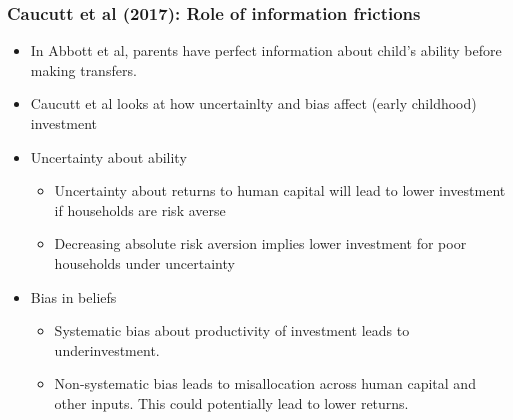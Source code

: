 \documentclass{beamer}
\begin{document}
\begin{frame}
\frametitle{Caucutt et al (2017): Role of information frictions}
\begin{itemize}
\item In Abbott et al, parents have perfect information about child's ability before making transfers.
\item Caucutt et al looks at how uncertainlty and bias affect (early childhood) investment 
\item Uncertainty about ability
\begin{itemize}
\item Uncertainty about returns to human capital will lead to lower investment if households are risk averse
\item Decreasing absolute risk aversion implies lower investment for poor households under uncertainty
\end{itemize}

\item Bias in beliefs
\begin{itemize}
\item Systematic bias about productivity of investment leads to underinvestment.
\item Non-systematic bias leads to misallocation across human capital and other inputs. This could potentially lead to lower returns. 
\end{itemize}
\end{itemize}
\end{frame}





\end{document}
